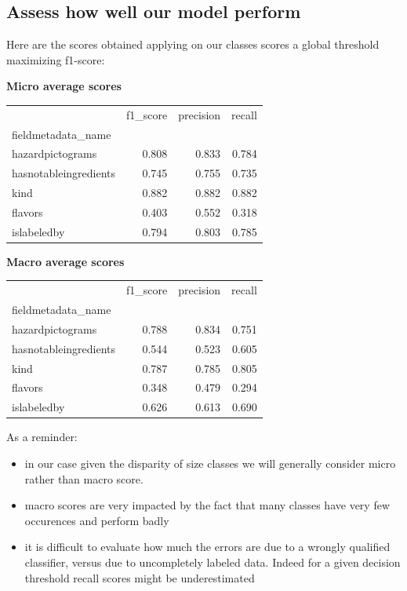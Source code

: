 \subsection{Assess how well our model perform}

Here are the scores obtained applying on our classes scores a global threshold maximizing f1-score:

\textbf{Micro average scores}
\begin{tabular}{lrrr}
\toprule
{} &  f1\_score &  precision &   recall \\
fieldmetadata\_name    &           &            &          \\
\midrule
hazardpictograms      &   0.808 &    0.833 &  0.784 \\
hasnotableingredients &   0.745 &    0.755 &  0.735 \\
kind                  &   0.882 &    0.882 &  0.882 \\
flavors               &   0.403 &    0.552 &  0.318 \\
islabeledby           &   0.794 &    0.803 &  0.785 \\
\bottomrule
\end{tabular}

\textbf{Macro average scores}
\begin{tabular}{lrrr}
\toprule
{} &  f1\_score &  precision &   recall \\
fieldmetadata\_name    &           &            &          \\
\midrule
hazardpictograms      &   0.788 &    0.834 &  0.751 \\
hasnotableingredients &   0.544 &    0.523 &  0.605 \\
kind                  &   0.787 &    0.785 &  0.805 \\
flavors               &   0.348 &    0.479 &  0.294 \\
islabeledby           &   0.626 &    0.613 &  0.690 \\
\bottomrule
\end{tabular}

As a reminder:
\begin{itemize}
 	\item in our case given the disparity of size classes we will generally consider micro rather than macro score.
 	\item macro scores are very impacted by the fact that many classes have very few occurences and perform badly
 	\item it is difficult to evaluate how much the errors are due to a wrongly qualified classifier, versus due to uncompletely labeled data. Indeed for a given decision threshold recall scores might be underestimated
\end{itemize}


